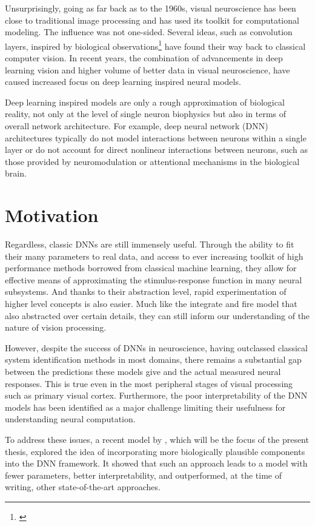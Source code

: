 Unsurprisingly, going as far back as to the 1960s, visual neuroscience has been close to traditional image processing and has used its toolkit for computational modeling. The influence was not one-sided. Several ideas, such as convolution layers, inspired by biological observations\footnote{\cite{Lindsay_2020}} have found their way back to classical computer vision. In recent years, the combination of advancements in deep learning vision and higher volume of better data in visual neuroscience, have caused increased focus on deep learning inspired neural models. 

Deep learning inspired models are only a rough approximation of biological reality, not only at the level of single neuron biophysics but also in terms of overall network architecture. For example, deep neural network (DNN) architectures typically do not model interactions between neurons within a single layer or do not account for direct nonlinear interactions between neurons, such as those provided by neuromodulation or attentional mechanisms in the biological brain. 

\section*{Motivation}
Regardless, classic DNNs are still immensely useful. Through the ability to fit their many parameters to real data, and access to ever increasing toolkit of high performance methods borrowed from classical machine learning, they allow for effective means of approximating the stimulus-response function in many neural subsystems. And thanks to their abstraction level, rapid experimentation of higher level concepts is also easier. Much like the integrate and fire model that also abstracted over certain details, they can still inform our understanding of the nature of vision processing. 

However, despite the success of DNNs in neuroscience, having outclassed classical system identification methods in most domains, there remains a substantial gap between the predictions these models give and the actual measured neural responses. This is true even in the most peripheral stages of visual processing such as primary visual cortex. Furthermore, the poor interpretability of the DNN models has been identified as a major challenge limiting their usefulness for understanding neural computation.

To address these issues, a recent model by \cite{antolik}, which will be the focus of the present thesis, explored the idea of incorporating more biologically plausible components into the DNN framework. It showed that such an approach leads to a model with fewer parameters, better interpretability, and outperformed, at the time of writing, other state-of-the-art approaches. 

